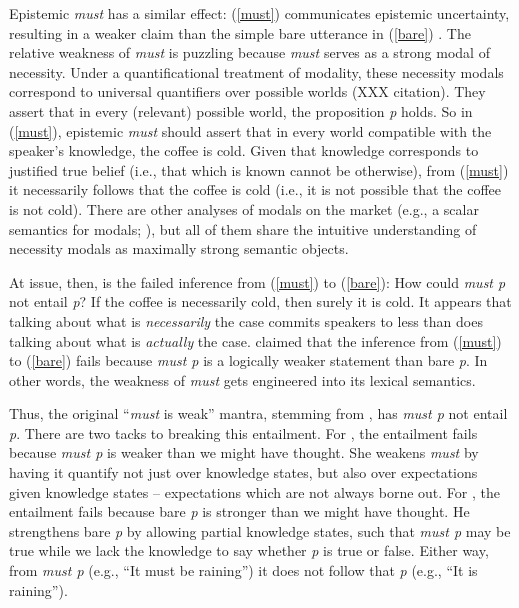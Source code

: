 \documentclass[11pt]{article}
\begin{document}
Epistemic \emph{must} has a similar effect: (\ref{must}) communicates epistemic uncertainty, resulting in a weaker claim than the simple bare utterance in (\ref{bare}) \citep{karttunen1972}. The relative weakness of \emph{must} is puzzling because \emph{must} serves as a strong modal of necessity. Under a quantificational treatment of modality, these necessity modals correspond to universal quantifiers over possible worlds (XXX citation). They assert that in every (relevant) possible world, the proposition \emph{p} holds. So in (\ref{must}), epistemic \emph{must} should assert that in every world compatible with the speaker's knowledge, the coffee is cold. Given that knowledge corresponds to justified true belief (i.e., that which is known cannot be otherwise), from (\ref{must}) it necessarily follows that the coffee is cold (i.e., it is not possible that the coffee is not cold). There are other analyses of modals on the market (e.g., a scalar semantics for modals; \citealp{lassiter2011}), but all of them share the intuitive understanding of necessity modals as maximally strong semantic objects.

At issue, then, is the failed inference from (\ref{must}) to (\ref{bare}): How could \emph{must p} not entail \emph{p}? If the coffee is necessarily cold, then surely it is cold. It appears that talking about what is \emph{necessarily} the case commits speakers to less than does talking about what is \emph{actually} the case. \cite{karttunen1972} claimed that the inference from (\ref{must}) to (\ref{bare}) fails because \emph{must p} is a logically weaker statement than bare \emph{p}. In other words, the weakness of \emph{must} gets engineered into its lexical semantics. 

Thus, the original ``\emph{must} is weak'' mantra, stemming from \cite{karttunen1972}, has \emph{must p} not entail \emph{p}. There are two tacks to breaking this entailment. For \cite{kratzer1991}, the entailment fails because  \emph{must p} is weaker than we might have thought. She weakens \emph{must} by having it quantify not just over knowledge states, but also over expectations given knowledge states -- expectations which are not always borne out. For \cite{veltman1985}, the entailment fails because bare \emph{p} is stronger than we might have thought. He strengthens bare \emph{p} by allowing partial knowledge states, such that \emph{must p} may be true while we lack the knowledge to say whether \emph{p} is true or false. Either way, from \emph{must p} (e.g., ``It must be raining'') it does not follow that \emph{p} (e.g., ``It is raining'').
\end{document}
